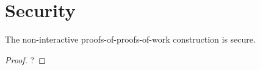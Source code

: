 \section{Security}

\begin{theorem}
    The non-interactive proofs-of-proofs-of-work construction is secure.
\end{theorem}

\begin{proof}
    ?
\end{proof}
